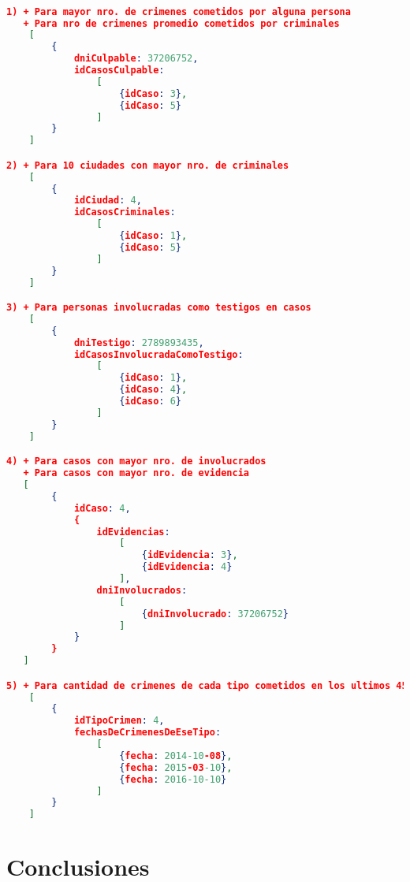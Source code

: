 \documentclass[11pt, a4paper]{article}
\begin{document}
\begin{lstlisting}[language=json]

1) + Para mayor nro. de crimenes cometidos por alguna persona 
   + Para nro de crimenes promedio cometidos por criminales
	[
		{
			dniCulpable: 37206752,
			idCasosCulpable:
				[ 
					{idCaso: 3}, 
					{idCaso: 5} 
				]
		}
	]

2) + Para 10 ciudades con mayor nro. de criminales
	[
		{
			idCiudad: 4,
			idCasosCriminales:
				[
					{idCaso: 1}, 
					{idCaso: 5}
				]
		}
	]

3) + Para personas involucradas como testigos en casos
	[
		{
			dniTestigo: 2789893435,
			idCasosInvolucradaComoTestigo:
				[
					{idCaso: 1},
					{idCaso: 4},
					{idCaso: 6}
				]
		}
	]

4) + Para casos con mayor nro. de involucrados
   + Para casos con mayor nro. de evidencia
   [
   		{
   			idCaso: 4,
	   		{
	   			idEvidencias: 
	   				[	
	   					{idEvidencia: 3},
	   					{idEvidencia: 4}
	   				],
	   			dniInvolucrados:
	   				[
	   					{dniInvolucrado: 37206752}
	   				]
	   		}
	   	}
   ]

5) + Para cantidad de crimenes de cada tipo cometidos en los ultimos 45 dias
	[
		{
			idTipoCrimen: 4,
			fechasDeCrimenesDeEseTipo:
				[
					{fecha: 2014-10-08},
					{fecha: 2015-03-10},
					{fecha: 2016-10-10}
				]
		}
	]

\end{lstlisting}

\section{Conclusiones}
\end{document}
